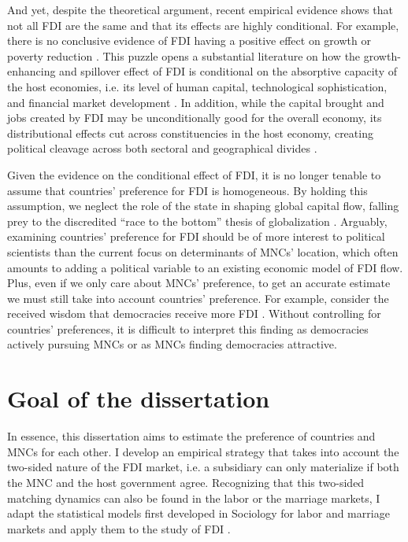 And yet, despite the theoretical argument, recent empirical evidence shows that
not all FDI are the same and that its effects are highly conditional. For
example, there is no conclusive evidence of FDI having a positive effect on
growth \citep{Nair-Reichert2001, Carkovic2002} or poverty reduction
\citep{Guerra2009}. This puzzle opens a substantial literature on how the
growth-enhancing and spillover effect of FDI is conditional on the absorptive
capacity of the host economies, i.e. its level of human capital, technological
sophistication, and financial market development \citep{Durham2004,
  Nunnenkamp2004, Fu2008, Willem2004}. In addition, while the capital brought
and jobs created by FDI may be unconditionally good for the overall economy, its
distributional effects cut across constituencies in the host economy, creating
political cleavage across both sectoral and geographical divides
\citep{Chintrakarn2012, Goldberg2007, Nunnenkamp2007}.

Given the evidence on the conditional effect of FDI, it is no longer tenable to
assume that countries' preference for FDI is homogeneous. By holding this
assumption, we neglect the role of the state in shaping global capital flow,
falling prey to the discredited ``race to the bottom'' thesis of globalization
\citep{Mosley2005}. Arguably, examining countries' preference for FDI should be
of more interest to political scientists than the current focus on determinants
of MNCs' location, which often amounts to adding a political variable to an
existing economic model of FDI flow. Plus, even if we only care about MNCs'
preference, to get an accurate estimate we must still take into account
countries' preference. For example, consider the received wisdom that
democracies receive more FDI \citep{Jensen2008a}. Without controlling for
countries' preferences, it is difficult to interpret this finding as democracies
actively pursuing MNCs or as MNCs finding democracies attractive.

\section{Goal of the dissertation}

In essence, this dissertation aims to estimate the preference of countries and
MNCs for each other. I develop an empirical strategy that takes into account the
two-sided nature of the FDI market, i.e. a subsidiary can only materialize if
both the MNC and the host government agree. Recognizing that this two-sided
matching dynamics can also be found in the labor or the marriage markets, I
adapt the statistical models first developed in Sociology for labor and marriage
markets and apply them to the study of FDI \citep{Logan1996, Logan2008}.

